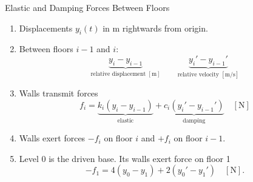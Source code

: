 \begin{frame}{Elastic and Damping Forces Between Floors}
\begin{enumerate}
  \item Displacements $y_i(t)$ in $\mathrm{m}$ rightwards from origin.
  \item Between floors $i-1$ and $i$:
  \[
    \underbrace{y_i-y_{i-1}}_{\text{relative displacement }[\mathrm m]}\qquad \underbrace{y_i'-y_{i-1}'}_{\text{relative velocity }[\mathrm{m/s}]}
  \]
  \item Walls transmit forces
  \[
    f_i=\underbrace{k_i(y_i-y_{i-1})}_{\text{elastic}}+\underbrace{c_i(y_i'-y_{i-1}')}_{\text{damping}}\quad[\mathrm N]
  \]
  \item Walls exert forces $-f_i$ on floor $i$ and $+f_i$ on floor $i-1$.
  \item Level 0 is the driven base. Its walls exert force on floor 1
  \[
    -f_1=4(y_0-y_1)+2(y_0'-y_1')\quad[\mathrm N].
  \]
\end{enumerate}
\end{frame}

